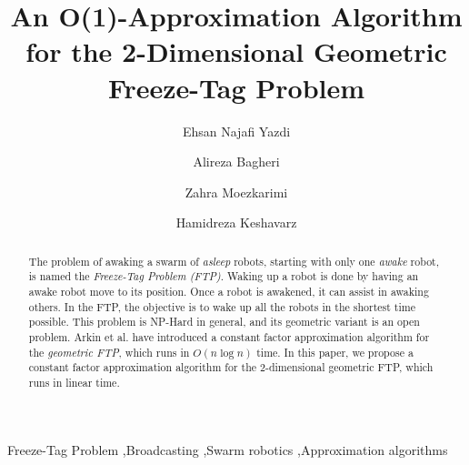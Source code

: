 \documentclass[review]{elsarticle}
\begin{document}
\begin{frontmatter}

\title{An O(1)-Approximation Algorithm for the 2-Dimensional Geometric Freeze-Tag Problem}

\author[aut]{Ehsan Najafi Yazdi}
\author[aut,iau]{Alireza Bagheri}
\author[aut]{Zahra Moezkarimi}
\author[tmu]{Hamidreza Keshavarz}

\address[aut]{Computer Engineering and Information Technology Department, Amirkabir University of Technology, Tehran, Iran}
\address[iau]{Computer Engineering Department, Tehran North Branch, Islamic Azad University, Tehran, Iran}
\address[tmu]{Faculty of Electrical and Computer Engineering, Tarbiat Modares University, Tehran, Iran}

\begin{abstract}
The problem of awaking a swarm of \textit{asleep} robots, starting with only one \textit{awake} robot, is named the \textit{Freeze-Tag Problem (FTP)}. Waking up a robot is done by having an awake robot move to its position. Once a robot is awakened, it can assist in awaking others. In the FTP, the objective is to wake up all the robots in the shortest time possible. This problem is NP-Hard in general, and its geometric variant is an open problem. Arkin et al. have introduced a constant factor approximation algorithm for the \textit{geometric FTP}, which runs in $O(n\log n)$ time. In this paper, we propose a constant factor approximation algorithm for the 2-dimensional geometric FTP, which runs in linear time.
\end{abstract}

\begin{keyword}
Freeze-Tag Problem \sep Broadcasting \sep Swarm robotics \sep Approximation algorithms
\end{keyword}

\end{frontmatter}

\linenumbers
\end{document}
